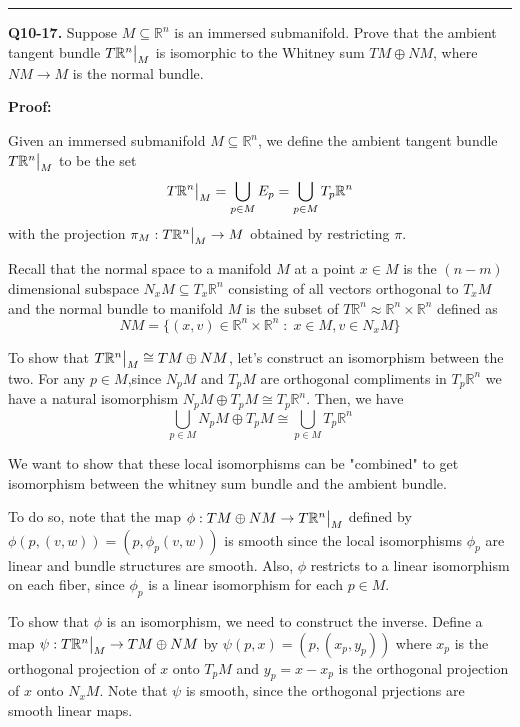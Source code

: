 \documentclass{article}
\newcommand{\R}{\mathbb{R}}
\newcommand{\restr}[2]{{%
  \left.\kern-\nulldelimiterspace %
  #1 %
  \vphantom{\big|} %
  \right|_{#2} %
  }}
\begin{document}
\vskip 0.5cm
\hrule 
\vskip 0.5cm


\textbf{Q10-17.} Suppose $M \subseteq \R^n$ is an immersed submanifold. Prove that the ambient tangent bundle $\restr{T\R^n}{M}$ is isomorphic to the Whitney sum $TM \oplus NM$, where $NM \rightarrow M$ is the normal bundle.

\vskip 0.5cm
\textbf{Proof:}

Given an immersed submanifold $M \subseteq \R^n$, we define the ambient tangent bundle $\restr{T\R^n}{M}$ to be the set \[ \restr{T\R^n}{M} = \bigcup_{p \in M} E_p = \bigcup_{p \in M} T_p\R^n  \] with the projection $\pi_M : \restr{T\R^n}{M} \rightarrow M $ obtained by restricting $\pi$.

\vskip 0.5cm
Recall that the normal space to a manifold $M$ at a point $x \in M$ is the $(n-m)$ dimensional subspace $N_x M \subseteq T_x \R^n$ consisting of all vectors orthogonal to $T_x M$ and the normal bundle to manifold $M$ is the subset of $T\R^n \approx \R^n \times \R^n$ defined as  
\[ NM = \{ (x, v) \in \R^n \times \R^n \;:\; x \in M, v \in N_x M \} \]

\vskip 0.5cm
To show that $\restr{T\R^n}{M} \cong TM \oplus NM$, let's construct an isomorphism between the two. For any $p \in M$,since $N_p M$ and $T_p M$ are orthogonal compliments in $T_p \R^n$ we have a natural isomorphism $N_p M \oplus T_p M \cong T_p \R^n$. Then, we have 
\[ \bigcup_{p \in M} N_p M \oplus T_pM \cong \bigcup_{p \in M} T_p \R^n \]

We want to show that these local isomorphisms can be "combined" to get isomorphism between the whitney sum bundle and the ambient bundle.

\vskip 0.5cm
To do so, note that the map $\phi : TM \oplus NM \rightarrow \restr{T\R^n}{M}$ defined by $\phi(p, (v,w)) = (p, \phi_p(v,w))$ is smooth since the local isomorphisms $\phi_p$ are linear and bundle structures are smooth. Also, $\phi$ restricts to a linear isomorphism on each fiber, since $\phi_p$ is a linear isomorphism for each $p \in M$.

\vskip 0.5cm
To show that $\phi$ is an isomorphism, we need to construct the inverse. Define a map $\psi : \restr{T\R^n}{M} \rightarrow TM \oplus NM$ by $\psi(p, x) = (p, (x_p, y_p))$ where $x_p$ is the orthogonal projection of $x$ onto $T_p M $ and $y_p = x - x_p$ is the orthogonal projection of $x$ onto $N_x M$. Note that $\psi$ is smooth, since the orthogonal prjections are smooth linear maps. 
\end{document}
